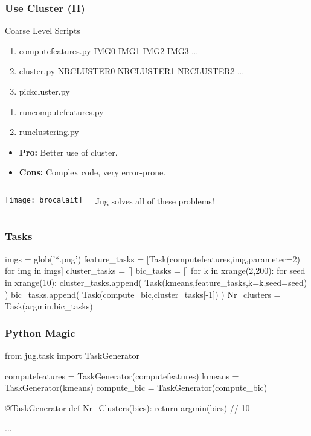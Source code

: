 \documentclass{beamer}
\begin{document}
\begin{frame}[fragile]
\frametitle{Use Cluster (II)}
\begin{block}{Coarse Level Scripts}
\begin{enumerate}
\item computefeatures.py IMG0 IMG1 IMG2 IMG3 \dots
\item cluster.py NRCLUSTER0 NRCLUSTER1 NRCLUSTER2 \dots
\item pickcluster.py
\end{enumerate}
\pause
\begin{enumerate}
\item runcomputefeatures.py
\item runclustering.py
\end{enumerate}
\end{block}

\pause
\begin{itemize}
\item \textbf{Pro:} Better use of cluster.
\item \textbf{Cons:} Complex code, very error-prone.
\end{itemize}
\end{frame}

\begin{frame}[fragile]

\begin{columns}[c]
\texttt{[image: brocalait]}

Jug solves all of these problems!

\end{columns}
\end{frame}

\begin{frame}[fragile]
\frametitle{Tasks}
\begin{python}
imgs = glob('*.png')
feature_tasks = [Task(computefeatures,img,parameter=2)
                    for img in imgs]
cluster_tasks = []
bic_tasks = []
for k in xrange(2,200):
    for seed in xrange(10):
        cluster_tasks.append(
            Task(kmeans,feature_tasks,k=k,seed=seed)
            )
        bic_tasks.append(
            Task(compute_bic,cluster_tasks[-1])
            )
Nr_clusters = Task(argmin,bic_tasks)
\end{python}
\end{frame}

\begin{frame}[fragile]
\frametitle{Python Magic}

\begin{python}
from jug.task import TaskGenerator

computefeatures = TaskGenerator(computefeatures)
kmeans = TaskGenerator(kmeans)
compute_bic = TaskGenerator(compute_bic)

@TaskGenerator
def Nr_Clusters(bics):
    return argmin(bics) // 10

...
\end{python}
\end{frame}
\end{document}

